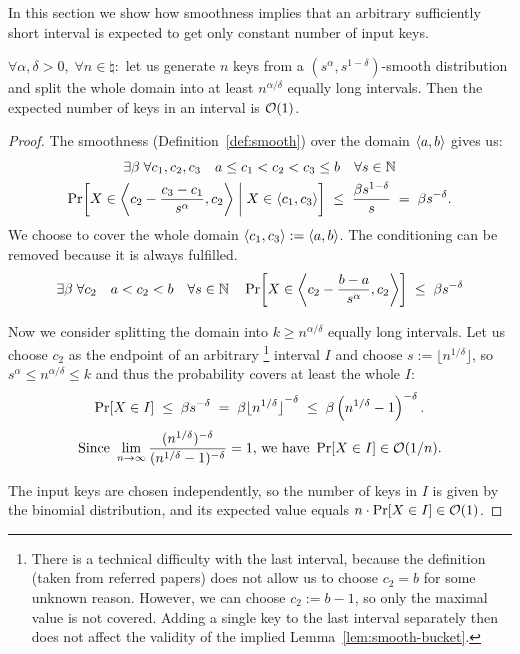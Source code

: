 
In this section we show how smoothness implies that an arbitrary sufficiently short interval is expected to get only constant number of input keys.

\begin{lemma} \label{lem:smooth-bucket}
	$\forall \alpha,\delta > 0, \;
	 \forall n \in \natural:
	$ let us generate $n$ keys from a $(s^\alpha,s^{1-\delta})$-smooth distribution and split the whole domain into at least $n^{\alpha / \delta}$ equally long intervals.
	Then the expected number of keys in an interval is $\mathcal O(1)$.

\begin{proof}

The smoothness (Definition~\ref{def:smooth}) over the domain $\left\langle a,b\right\rangle$ gives us:
\begin{multline*}
	\exists\beta \; \forall c_1,c_2,c_3 \quad a \le c_1 < c_2 < c_3 \le b \quad \forall s \in \mathbb{N} \\
		\Pr\!\left[  X \in \left\langle c_2 - \frac{c_3-c_1}{s^\alpha} ,c_2\right\rangle \; \middle| \; X \in \left\langle c_1,c_3\right\rangle  \right]
		\;\le\; \frac{\beta s^{1-\delta}}{s}  \;=\;  \beta s^{-\delta}.
\end{multline*}
We choose to cover the whole domain $\left\langle c_1,c_3\right\rangle := \left\langle a,b\right\rangle$. The conditioning can be removed because it is always fulfilled.
\[
	\exists\beta \; \forall c_2 \quad a < c_2 < b \quad \forall s \in \mathbb{N} \quad
		\Pr\!\left[  X \in \left\langle c_2 - \frac{b-a}{s^\alpha} ,c_2\right\rangle  \right]
		\;\le\; \beta s^{-\delta}
\]

Now we consider splitting the domain into $k \ge n^{\alpha / \delta}$ equally long intervals.
Let us choose $c_2$ as the endpoint of an arbitrary%
	\footnote{There is a technical difficulty with the last interval, because the definition (taken from referred papers) does not allow us to choose $c_2 = b$ for some unknown reason.
	However, we can choose $c_2 := b-1$, so only the maximal value is not covered. Adding a single key to the last interval separately then does not affect the validity of the implied Lemma~\ref{lem:smooth-bucket}.}
interval $I$ and choose $s:= \lfloor n^{1 / \delta} \rfloor$, so
$ s^\alpha \le n^{\alpha / \delta} \le k $ and thus the probability covers at least the whole $I$:
\[	\Pr\!\left[X \in I\right] \;\le\; \beta s^{-\delta}
	\;=\; \beta {\lfloor n^{1 / \delta} \rfloor}^{-\delta}
	\;\le\; \beta \left( n^{1 / \delta} - 1 \right) ^{-\delta}.
\] \[
\text{Since } \lim_{n \to \infty}
	\frac{ ( n^{1 / \delta} ) ^{-\delta} }{ ( n^{1 / \delta} - 1 ) ^{-\delta} }
	= 1 \text{, we have } \Pr\!\left[X \in I\right] \in \mathcal O(1/n).
\]

The input keys are chosen independently, so the number of keys in $I$ is given by the binomial distribution, and its expected value equals
$ n \cdot \Pr\!\left[X \in I\right] \in \mathcal O(1)$.

\end{proof}
\end{lemma}


